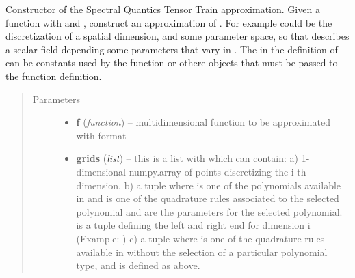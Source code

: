 \documentclass[a4paper,10pt,english]{sphinxmanual}
\begin{document}
\begin{fulllineitems}
\label{api-core:TensorToolbox.core.SQTT}
Constructor of the Spectral Quantics Tensor Train approximation. Given a function 
with  and , construct an approximation of . For example  could be the discretization of a spatial dimension, and  some parameter space, so that  describes a scalar field depending some parameters that vary in . The  in the definition of  can be constants used by the function or othere objects that must be passed to the function definition.
\begin{quote}\begin{description}
\item[{Parameters}] \leavevmode\begin{itemize}
\item {} 
\textbf{f} (\emph{function}) -- multidimensional function to be approximated with format 

\item {} 
\textbf{grids} (\href{http://docs.python.org/library/functions.html\#list}{\emph{list}}) -- this is a list with  which can contain:
a) 1-dimensional numpy.array of points discretizing the i-th dimension,
b) a tuple  where  is one of the polynomials available in  and  is one of the quadrature rules associated to the selected polynomial and  are the parameters for the selected polynomial.  is a tuple defining the left and right end for dimension i (Example: )
c) a tuple  where  is one of the quadrature rules available in  without the selection of a particular polynomial type, and  is defined as above.


\end{itemize}
\end{description}
\end{quote}
\end{fulllineitems}
\end{document}
